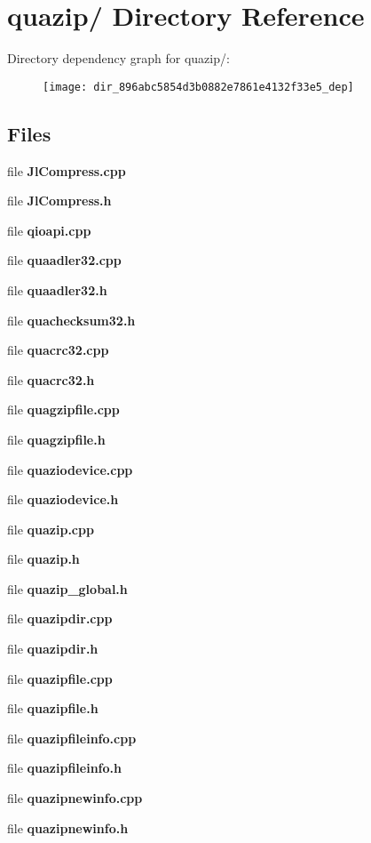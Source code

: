 \section{quazip/ \-Directory \-Reference}
\label{dir_896abc5854d3b0882e7861e4132f33e5}
\-Directory dependency graph for quazip/\-:
\nopagebreak
\begin{figure}[H]
\begin{center}
\leavevmode
\texttt{[image: dir\_896abc5854d3b0882e7861e4132f33e5\_dep]}
\end{center}
\end{figure}
\subsection*{\-Files}
\begin{DoxyCompactItemize}
\item 
file {\bfseries \-Jl\-Compress.\-cpp}
\item 
file {\bfseries \-Jl\-Compress.\-h}
\item 
file {\bfseries qioapi.\-cpp}
\item 
file {\bfseries quaadler32.\-cpp}
\item 
file {\bfseries quaadler32.\-h}
\item 
file {\bfseries quachecksum32.\-h}
\item 
file {\bfseries quacrc32.\-cpp}
\item 
file {\bfseries quacrc32.\-h}
\item 
file {\bfseries quagzipfile.\-cpp}
\item 
file {\bfseries quagzipfile.\-h}
\item 
file {\bfseries quaziodevice.\-cpp}
\item 
file {\bfseries quaziodevice.\-h}
\item 
file {\bfseries quazip.\-cpp}
\item 
file {\bfseries quazip.\-h}
\item 
file {\bfseries quazip\-\_\-global.\-h}
\item 
file {\bfseries quazipdir.\-cpp}
\item 
file {\bfseries quazipdir.\-h}
\item 
file {\bfseries quazipfile.\-cpp}
\item 
file {\bfseries quazipfile.\-h}
\item 
file {\bfseries quazipfileinfo.\-cpp}
\item 
file {\bfseries quazipfileinfo.\-h}
\item 
file {\bfseries quazipnewinfo.\-cpp}
\item 
file {\bfseries quazipnewinfo.\-h}
\end{DoxyCompactItemize}
